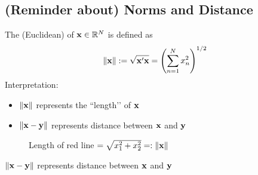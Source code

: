 \documentclass[letterpaper,10pt,english]{jupyterBook}
\begin{document}
\subsection{(Reminder about) Norms and Distance}
\label{\detokenize{05.linear_algebra:reminder-about-norms-and-distance}}
\sphinxAtStartPar
The (Euclidean)  of \({\bf x} \in \mathbb{R}^N\) is defined as
\begin{equation*}
\begin{split}
%
\| {\bf x} \| 
:= \sqrt{{\bf x}' {\bf x} } 
= \left( \sum_{n=1}^N x_n^2 \right)^{1/2}
%
\end{split}
\end{equation*}
\sphinxAtStartPar
Interpretation:
\begin{itemize}
\item {} 
\sphinxAtStartPar
\(\| {\bf x} \|\) represents the ``length’’ of \({\bf x}\)

\item {} 
\sphinxAtStartPar
\(\| {\bf x} - {\bf y} \|\) represents distance between \({\bf x}\) and \({\bf y}\)

\end{itemize}

\begin{figure}[htbp]
\centering
\capstart

\noindent{}
\caption{Length of red line \(= \sqrt{x_1^2 + x_2^2}
=: \|{\bf x}\|\)}\label{\detokenize{05.linear_algebra:f-vec-rpt}}\end{figure}

\sphinxAtStartPar
\(\| {\bf x} - {\bf y} \|\) represents distance between \({\bf x}\) and \({\bf y}\)

\begin{figure}[htbp]
\centering

\noindent{}
\end{figure}
\end{document}

